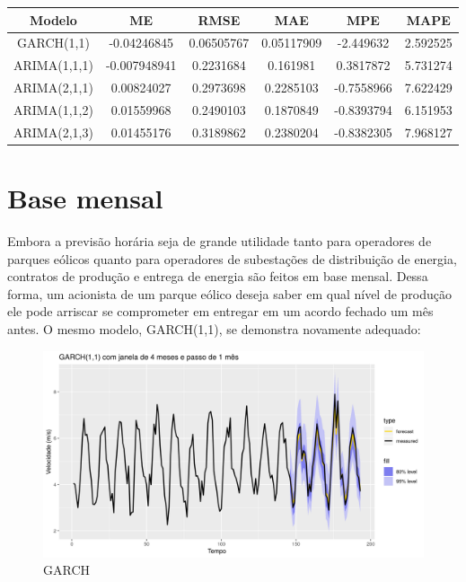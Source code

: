 \documentclass[
	12pt,				%
	openright,			%
	oneside,			%
	a4paper,			%
	english,			%
	french,				%
	spanish,			%
	brazil				%
	]{abntex2}
\begin{document}
\begin{table}[h]
\centering
\begin{tabular}{ |c|c|c|c|c|c| } 
\hline
\textbf{Modelo}&\textbf{ME}&\textbf{RMSE}&\textbf{MAE}&\textbf{MPE}&\textbf{MAPE}\\
\hline
GARCH(1,1)&-0.04246845&0.06505767&0.05117909&-2.449632&2.592525 \\
\hline
ARIMA(1,1,1)&-0.007948941&0.2231684&0.161981&0.3817872&5.731274 \\
\hline
ARIMA(2,1,1)&0.00824027&0.2973698&0.2285103&-0.7558966&7.622429 \\
\hline
ARIMA(1,1,2)&0.01559968&0.2490103&0.1870849&-0.8393794&6.151953 \\
\hline
ARIMA(2,1,3)&0.01455176&0.3189862&0.2380204&-0.8382305&7.968127 \\
\hline
\end{tabular}
\end{table}

\section{Base mensal}

Embora a previsão horária seja de grande utilidade tanto para operadores de parques eólicos quanto para operadores de subestações de distribuição de energia, contratos de produção e entrega de energia são feitos em base mensal. Dessa forma, um acionista de um parque eólico deseja saber em qual nível de produção ele pode arriscar se comprometer em entregar em um acordo fechado um mês antes. O mesmo modelo, GARCH(1,1), se demonstra novamente adequado:

\begin{figure}[h]
    \centering
	\includegraphics[width=\textwidth]{garch_month}
	\caption{GARCH}
\end{figure}
\FloatBarrier
\end{document}
